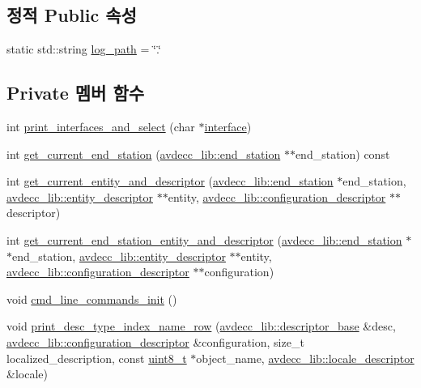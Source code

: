 \subsection*{정적 Public 속성}
\begin{DoxyCompactItemize}
\item 
static std\+::string \hyperlink{classcmd__line_ab9a5e2965a8a7be88b0a1e296d4cc0be}{log\+\_\+path} = \char`\"{}.\char`\"{}
\end{DoxyCompactItemize}
\subsection*{Private 멤버 함수}
\begin{DoxyCompactItemize}
\item 
int \hyperlink{classcmd__line_ae3db48c8f946353840a10a11d2901872}{print\+\_\+interfaces\+\_\+and\+\_\+select} (char $\ast$\hyperlink{rawsock__tx_8c_af663a7576d2f8f288bb3996381484cd3}{interface})
\item 
int \hyperlink{classcmd__line_aa7ddf8d9fbcf5d1c6c5f329bc850418c}{get\+\_\+current\+\_\+end\+\_\+station} (\hyperlink{classavdecc__lib_1_1end__station}{avdecc\+\_\+lib\+::end\+\_\+station} $\ast$$\ast$end\+\_\+station) const 
\item 
int \hyperlink{classcmd__line_aa22ed7f036749918eb875043f10060c9}{get\+\_\+current\+\_\+entity\+\_\+and\+\_\+descriptor} (\hyperlink{classavdecc__lib_1_1end__station}{avdecc\+\_\+lib\+::end\+\_\+station} $\ast$end\+\_\+station, \hyperlink{classavdecc__lib_1_1entity__descriptor}{avdecc\+\_\+lib\+::entity\+\_\+descriptor} $\ast$$\ast$entity, \hyperlink{classavdecc__lib_1_1configuration__descriptor}{avdecc\+\_\+lib\+::configuration\+\_\+descriptor} $\ast$$\ast$descriptor)
\item 
int \hyperlink{classcmd__line_ac2d4611fba7db03d436a2e3c1e64828e}{get\+\_\+current\+\_\+end\+\_\+station\+\_\+entity\+\_\+and\+\_\+descriptor} (\hyperlink{classavdecc__lib_1_1end__station}{avdecc\+\_\+lib\+::end\+\_\+station} $\ast$$\ast$end\+\_\+station, \hyperlink{classavdecc__lib_1_1entity__descriptor}{avdecc\+\_\+lib\+::entity\+\_\+descriptor} $\ast$$\ast$entity, \hyperlink{classavdecc__lib_1_1configuration__descriptor}{avdecc\+\_\+lib\+::configuration\+\_\+descriptor} $\ast$$\ast$configuration)
\item 
void \hyperlink{classcmd__line_a07a8102c5bb87ccbe570af0bddfad07b}{cmd\+\_\+line\+\_\+commands\+\_\+init} ()
\item 
void \hyperlink{classcmd__line_ac47c21c03b69593b74e7c43201d0ba41}{print\+\_\+desc\+\_\+type\+\_\+index\+\_\+name\+\_\+row} (\hyperlink{classavdecc__lib_1_1descriptor__base}{avdecc\+\_\+lib\+::descriptor\+\_\+base} \&desc, \hyperlink{classavdecc__lib_1_1configuration__descriptor}{avdecc\+\_\+lib\+::configuration\+\_\+descriptor} \&configuration, size\+\_\+t localized\+\_\+description, const \hyperlink{stdint_8h_aba7bc1797add20fe3efdf37ced1182c5}{uint8\+\_\+t} $\ast$object\+\_\+name, \hyperlink{classavdecc__lib_1_1locale__descriptor}{avdecc\+\_\+lib\+::locale\+\_\+descriptor} \&locale)

\end{DoxyCompactItemize}
